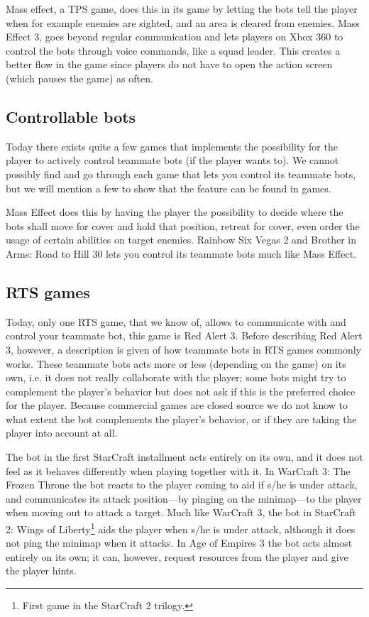 Mass effect\cite{masseffect}, a TPS game, does this in its game by letting the bots tell the player when for example
enemies are sighted, and an area is cleared from enemies. Mass Effect 3, goes beyond regular
communication and lets players on Xbox 360 to control the bots through voice commands, like a squad
leader. This creates a better flow in the game since players do not have to open the action screen
(which pauses the game) as often.


\subsection{Controllable bots} \label{sec:games_controllable} Today there exists quite a few games
that implements the possibility for the player to actively control teammate bots (if the player
wants to). We cannot possibly find and go through each game that lets you control its teammate bots,
but we will mention a few to show that the feature can be found in games.

Mass Effect\cite{masseffect} does this by having the player the possibility to decide where the bots
shall move for cover and hold that position, retreat for cover, even order the usage of certain
abilities on target enemies. Rainbow Six Vegas 2\cite{rainbow6} and Brother in Arms: Road to Hill
30\cite{brotherinarms} lets you control its teammate bots much like Mass Effect.


\subsection{RTS games}
Today, only one RTS game, that we know of, allows to communicate with and
control your teammate bot, this game is Red Alert 3\cite{redalert3}. Before describing Red Alert 3,
however, a description is given of how teammate bots in RTS games commonly works. These teammate
bots acts more or less (depending on the game) on its own, i.e. it does not really collaborate with
the player; some bots might try to complement the player's behavior but does not ask if this is the
preferred choice for the player. Because commercial games are closed source we do not know to what
extent the bot complements the player's behavior, or if they are taking the player into account
at all.

The bot in the first StarCraft\cite{scbw} installment acts entirely on its own, and it does not feel
as it behaves differently when playing together with it. In WarCraft 3: The Frozen
Throne\cite{wc3ft} the bot reacts to the player coming to aid if s/he is under attack, and
communicates its attack position—by pinging on the minimap—to the player when moving out to attack a
target. Much like WarCraft 3, the bot in StarCraft 2: Wings of Liberty\footnote{First game in the
StarCraft 2 trilogy.}\cite{sc2wol} aids the player when s/he is under attack, although it does not
ping the minimap when it attacks. In Age of Empires 3\cite{ageofempires3} the bot acts almost
entirely on its own; it can, however, request resources from the player and give the player hints.

